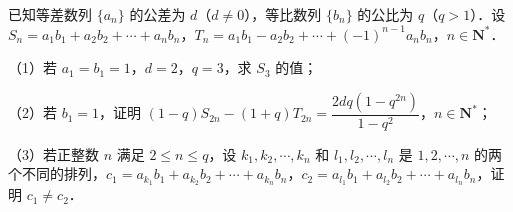 \begin{question}
已知等差数列 $\{a_n\}$ 的公差为 $d$（$d\neq0$），等比数列 $\{b_n\}$ 的公比为 $q$（$q>1$）．设 $S_n=a_1b_1+a_2b_2+\cdots+a_nb_n$，$T_n=a_1b_1-a_2b_2+\cdots+(-1)^{n-1}a_nb_n$，$n\in\mathbf N^*$．

（1）若 $a_1=b_1=1$，$d=2$，$q=3$，求 $S_3$ 的值；

（2）若 $b_1=1$，证明 $(1-q)S_{2n}-(1+q)T_{2n}=\dfrac{2dq(1-q^{2n})}{1-q^2}$，$n\in\mathbf N^*$；

（3）若正整数 $n$ 满足 $2\leqslant n\leqslant q$，设 $k_1,k_2,\cdots,k_n$ 和 $l_1,l_2,\cdots,l_n$ 是 $1,2,\cdots,n$ 的两个不同的排列，$c_1=a_{k_1}b_1+a_{k_2}b_2+\cdots+a_{k_n}b_n$，$c_2=a_{l_1}b_1+a_{l_2}b_2+\cdots+a_{l_n}b_n$，证明 $c_1\neq c_2$．

\end{question}